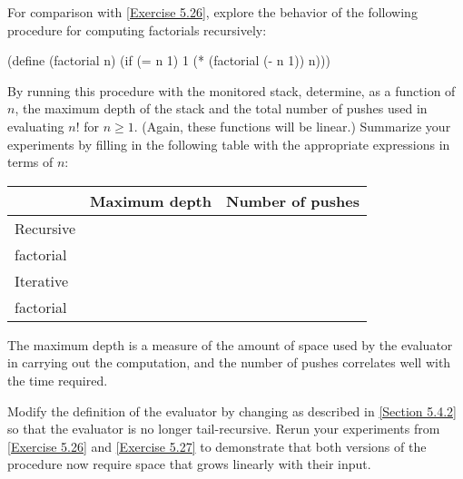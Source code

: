 \begin{exercise}
	\label{Exercise 5.27}
	For comparison with \cref{Exercise 5.26}, explore the behavior of the following procedure for computing factorials recursively:
	\begin{scheme}
	  (define (factorial n)
	    (if (= n 1) 1 (* (factorial (- n 1)) n)))
	\end{scheme}
	By running this procedure with the monitored stack, determine, as a function of \( n \), the maximum depth of the stack and the total number of pushes used in evaluating \( n! \) for \( n ≥ 1 \).
	(Again, these functions will be linear.)
	Summarize your experiments by filling in the following table with the appropriate expressions in terms of \( n \):
	\begin{center}
		\begin{tabular}{lll}
			{}        & Maximum depth & Number of pushes \\
			\midrule
			Recursive & {}            & {}               \\
			factorial & {}            & {}               \\
			\midrule
			Iterative & {}            & {}               \\
			factorial & {}            & {}               \\
			\midrule
		\end{tabular}
	\end{center}
	The maximum depth is a measure of the amount of space used by the evaluator in carrying out the computation, and the number of pushes correlates well with the time required.
\end{exercise}

\begin{exercise}
	\label{Exercise 5.28}
	Modify the definition of the evaluator by changing  as described in \cref{Section 5.4.2} so that the evaluator is no longer tail-recursive.
	Rerun your experiments from \cref{Exercise 5.26} and \cref{Exercise 5.27} to demonstrate that both versions of the  procedure now require space that grows linearly with their input.
\end{exercise}

